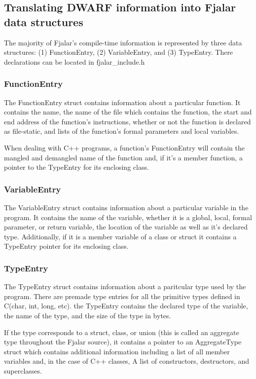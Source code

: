 \documentclass[11pt]{report}
\begin{document}
\subsection{Translating DWARF information into Fjalar data structures}
The majority of Fjalar's compile-time information is represented by
three data structures: (1) FunctionEntry, (2) VariableEntry, and (3)
TypeEntry. There declarations can be located in fjalar\_include.h

\subsubsection{FunctionEntry}
The FunctionEntry struct contains information about a particular
function. It contains the name, the name of the file which  
contains the function, the start and end address of the function's 
instructions, whether or not the function is declared as file-static,
and lists of the function's formal parameters and local variables. 

When dealing with C++ programs, a function's FunctionEntry will  
contain the mangled and demangled name of the function and, if it's a
member function, a pointer to the TypeEntry for its enclosing class.

\subsubsection{VariableEntry}
The VariableEntry struct contains information about a particular
variable in the program. It contains the name of the variable, whether
it is a global, local, formal parameter, or return variable, the
location of the variable as well as it's declared type. Additionally,
if it is a member variable of a class or struct it contains a
TypeEntry pointer for its enclosing class.


\subsubsection{TypeEntry}
The TypeEntry struct contains information about a paritcular type used
by the program. There are premade type entries for all the primitive
types defined in C(char, int, long, etc). the TypeEntry contains the
declared type of the variable, the name of the type, and the size of
the type in bytes.

If the type corresponds to a struct, class, or union (this is called
an aggregate type throughout the Fjalar source), it contains a pointer
to an AggregateType struct which contains additional information
including a list of all member variables and, in the case of C++
classes, A list of constructors, destructors, and superclasses.
\end{document}
